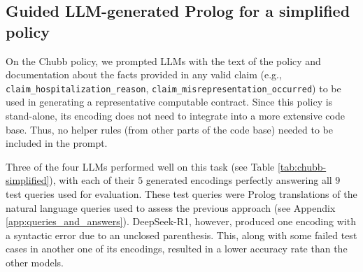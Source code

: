 \subsection{Guided LLM-generated Prolog for a simplified policy}
\label{sec:expert-informed-chubb}
On the Chubb policy, we prompted LLMs with the text of the policy and documentation about the facts provided in any valid claim (e.g., \verb|claim_hospitalization_reason|, \verb|claim_misrepresentation_occurred|) to be used in generating a representative computable contract. Since this policy is stand-alone, its encoding does not need to integrate into a more extensive code base. Thus, no helper rules (from other parts of the code base) needed to be included in the prompt.

Three of the four LLMs performed well on this task (see Table \ref{tab:chubb-simplified}), with each of their $5$ generated encodings perfectly answering all $9$ test queries used for evaluation. These test queries were Prolog translations of the natural language queries used to assess the previous approach (see Appendix \ref{app:queries_and_answers}). DeepSeek-R1, however, produced one encoding with a syntactic error due to an unclosed parenthesis. This, along with some failed test cases in another one of its encodings, resulted in a lower accuracy rate than the other models.

